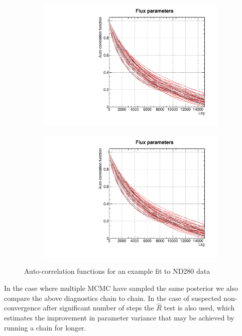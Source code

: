 \begin{figure}[h]
	\begin{subfigure}[t]{0.44\textwidth}
		\includegraphics[width=\textwidth, trim={0mm 0mm 0mm 0mm}, clip,page=1]{figures/mcmc/2018a_MultiPi_Binningv6_NewCov_Data_merge_MCMC_diag}
	\end{subfigure}
	\begin{subfigure}[t]{0.44\textwidth}
		\includegraphics[width=\textwidth, trim={0mm 0mm 0mm 0mm}, clip,page=2]{figures/mcmc/2018a_MultiPi_Binningv6_NewCov_Data_merge_MCMC_diag}
	\end{subfigure}
	\caption{Auto-correlation functions for an example fit to ND280 data}
	\label{fig:auto_corr}
\end{figure}

In the case where multiple MCMC have sampled the same posterior we also compare the above diagnostics chain to chain. In the case of suspected non-convergence after significant number of steps the $\hat{R}$ test\cite{gelman_rubin} is also used, which estimates the improvement in parameter variance that may be achieved by running a chain for longer.

